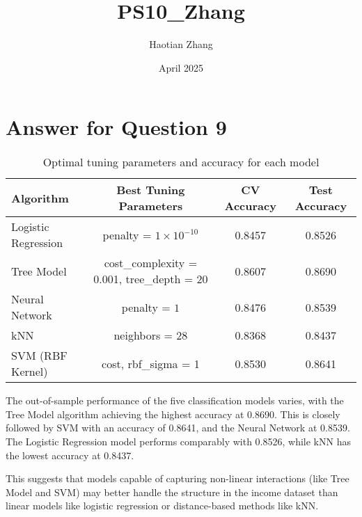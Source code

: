 \documentclass{article}
\title{PS10_Zhang}
\author{Haotian Zhang}
\date{April 2025}
\begin{document}
\maketitle
\section{Answer for Question 9}
\begin{table}[H]
\centering
\begin{tabular}{lccc}
\hline
\textbf{Algorithm} & \textbf{Best Tuning Parameters} & \textbf{CV Accuracy} & \textbf{Test Accuracy} \\
\hline
Logistic Regression & penalty = $1 \times 10^{-10}$ & 0.8457 & 0.8526 \\
Tree Model       & cost\_complexity = 0.001, tree\_depth = 20 & 0.8607 & 0.8690 \\
Neural Network      & penalty = $1$ & 0.8476 & 0.8539 \\
kNN                 & neighbors = 28 & 0.8368 & 0.8437 \\
SVM (RBF Kernel)    & cost, rbf\_sigma = 1 & 0.8530 & 0.8641 \\
\hline
\end{tabular}
\caption{Optimal tuning parameters and accuracy for each model}
\end{table}

The out-of-sample performance of the five classification models varies, with the Tree Model algorithm achieving the highest accuracy at 0.8690. This is closely followed by SVM with an accuracy of 0.8641, and the Neural Network at 0.8539. The Logistic Regression model performs comparably with 0.8526, while kNN has the lowest accuracy at 0.8437.

This suggests that models capable of capturing non-linear interactions (like Tree Model and SVM) may better handle the structure in the income dataset than linear models like logistic regression or distance-based methods like kNN.
\end{document}
